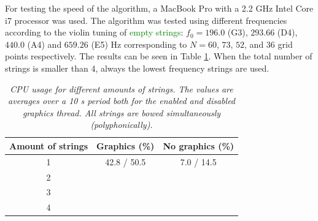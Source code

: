 \documentclass[twoside,a4paper,dvipsnames]{article}
\def\SWcomment[#1]{\textcolor{Green}{#1}}
\begin{document}
For testing the speed of the algorithm, a MacBook Pro with a 2.2 GHz Intel Core i7 processor was used. The algorithm was tested using different frequencies according to the violin tuning of \SWcomment[empty strings]: $f_0 = 196.0$ (G3), $293.66$ (D4), $440.0$ (A4) and $659.26$ (E5) Hz corresponding to $N = 60$, $73$, $52$, and $36$ grid points respectively. The results can be seen in Table \ref{tab:results}. When the total number of strings is smaller than 4, always the lowest frequency strings are used.
   

\begin{table}[h]
  \caption{{\it CPU usage for different amounts of strings. The values are averages over a 10 s period both for the enabled and disabled graphics thread. All strings are bowed simultaneously (polyphonically).}}
	\centering
  \begin{tabular}{|c|c|c|}\hline
   
    Amount of strings & Graphics (\%) & No graphics (\%)\\
    \hline
    1 & 42.8 / 50.5 & 7.0 / 14.5\\
    2 &  & \\
    3 &  & \\
    4 &  & \\
    \hline
 \end{tabular}
  \label{tab:results}
\end{table}
\end{document}
